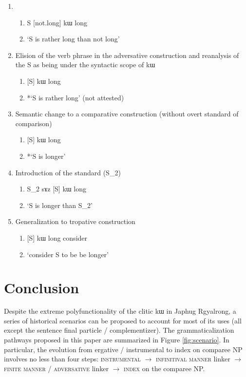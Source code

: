 \documentclass[oldfontcommands,oneside,a4paper,11pt]{article}
\newcommand{\ipa}[1]{{\phon #1}} %
\begin{document}
\begin{enumerate} 
\item 
\begin{enumerate} 
\item S [not.long] \ipa{kɯ} long 
\item `S is rather long than not long'
\end{enumerate} 
\item Elision of the verb phrase in the adversative construction  and reanalysis of the S as being under the syntactic scope of \ipa{kɯ}
\begin{enumerate} 
\item{} [S] \ipa{kɯ} long  
\item *`S is rather long' (not attested)
\end{enumerate} 
\item Semantic change to a comparative construction (without overt standard of comparison)
\begin{enumerate} 
\item{} [S] \ipa{kɯ} long  
\item *`S is longer'  
\end{enumerate} 
\item Introduction of the standard (S_2)
\begin{enumerate} 
\item{} S_2 \ipa{sɤz} [S] \ipa{kɯ} long  
\item  `S is longer than S_2'
\end{enumerate} 
\item Generalization to tropative construction
\begin{enumerate} 
\item{}  [S] \ipa{kɯ} long  consider  
\item  `consider S to be be longer'
\end{enumerate} 
 
\end{enumerate}
  
 


  \section{Conclusion}
Despite the extreme polyfunctionality of the    clitic \ipa{kɯ} in Japhug Rgyalrong, a series of historical scenarios can be proposed to account for most of its uses (all except the sentence final particle / complementizer). The grammaticalization pathways  proposed in this paper are summarized in Figure \ref{fig:scenario}. In particular, the evolution from ergative / instrumental to index on comparee NP involves no less than four steps: \textsc{instrumental} $\rightarrow$ \textsc{infinitival manner} linker $\rightarrow$  \textsc{finite manner} / \textsc{adversative}  linker      $\rightarrow$  \textsc{index} on the comparee NP.
\end{document}
